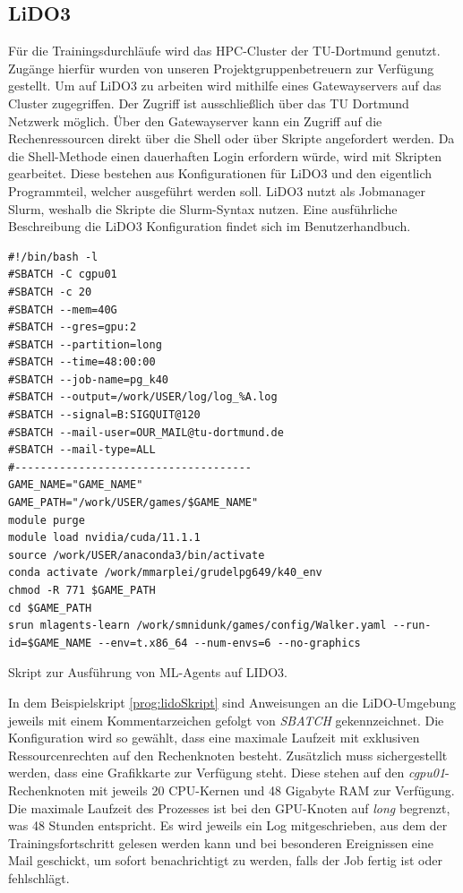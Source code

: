 \subsection{LiDO3}
Für die Trainingsdurchläufe wird das HPC-Cluster der TU-Dortmund genutzt. Zugänge hierfür wurden von unseren Projektgruppenbetreuern zur Verfügung gestellt. Um auf LiDO3 zu arbeiten wird mithilfe eines Gatewayservers auf das Cluster zugegriffen. Der Zugriff ist ausschließlich über das TU Dortmund Netzwerk möglich. Über den Gatewayserver kann ein Zugriff auf die Rechenressourcen direkt über die Shell oder über Skripte angefordert werden. Da die Shell-Methode einen dauerhaften Login erfordern würde, wird mit Skripten gearbeitet. Diese bestehen aus Konfigurationen für LiDO3 und den eigentlich Programmteil, welcher ausgeführt werden soll. LiDO3 nutzt als Jobmanager Slurm, weshalb die Skripte die Slurm-Syntax nutzen. Eine ausführliche Beschreibung die LiDO3 Konfiguration findet sich im Benutzerhandbuch\cite{lido}.
\begin{listing}
	\begin{verbatim}
#!/bin/bash -l
#SBATCH -C cgpu01
#SBATCH -c 20
#SBATCH --mem=40G
#SBATCH --gres=gpu:2
#SBATCH --partition=long
#SBATCH --time=48:00:00
#SBATCH --job-name=pg_k40
#SBATCH --output=/work/USER/log/log_%A.log
#SBATCH --signal=B:SIGQUIT@120
#SBATCH --mail-user=OUR_MAIL@tu-dortmund.de
#SBATCH --mail-type=ALL
#-------------------------------------
GAME_NAME="GAME_NAME"
GAME_PATH="/work/USER/games/$GAME_NAME"
module purge
module load nvidia/cuda/11.1.1
source /work/USER/anaconda3/bin/activate
conda activate /work/mmarplei/grudelpg649/k40_env
chmod -R 771 $GAME_PATH
cd $GAME_PATH
srun mlagents-learn /work/smnidunk/games/config/Walker.yaml --run-id=$GAME_NAME --env=t.x86_64 --num-envs=6 --no-graphics
	\end{verbatim}
	\caption{Skript zur Ausführung von ML-Agents auf LIDO3.}
	\label{prog:lidoSkript}
\end{listing}

In dem Beispielskript \ref{prog:lidoSkript} sind Anweisungen an die LiDO-Umgebung jeweils mit einem Kommentarzeichen gefolgt von \emph{SBATCH} gekennzeichnet. Die Konfiguration wird so gewählt, dass eine maximale Laufzeit mit exklusiven Ressourcenrechten auf den Rechenknoten besteht. Zusätzlich muss sichergestellt werden, dass eine Grafikkarte zur Verfügung steht. Diese stehen auf den \emph{cgpu01}-Rechenknoten mit jeweils 20 CPU-Kernen und 48 Gigabyte RAM zur Verfügung. Die maximale Laufzeit des Prozesses ist bei den GPU-Knoten auf \emph{long} begrenzt, was 48 Stunden entspricht. Es wird jeweils ein Log mitgeschrieben, aus dem der Trainingsfortschritt gelesen werden kann und bei besonderen Ereignissen eine Mail geschickt, um sofort benachrichtigt zu werden, falls der Job fertig ist oder fehlschlägt.

